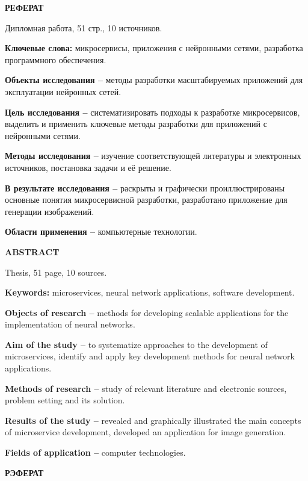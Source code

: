 \begin{center}
  \large\bfseries{РЕФЕРАТ}
\end{center}

Дипломная работа, 51 стр., 10 источников.

\textbf{Ключевые слова:} микросервисы, приложения с нейронными сетями, разработка программного обеспечения.

\textbf{Объекты исследования --} методы разработки масштабируемых приложений для эксплуатации нейронных сетей.

\textbf{Цель исследования --} систематизировать подходы к разработке микросервисов, выделить и применить ключевые методы разработки для приложений с нейронными сетями.

\textbf{Методы исследования --} изучение соответствующей литературы и электронных источников, постановка задачи и её решение.

\textbf{В результате исследования --} раскрыты и графически проиллюстрированы основные понятия микросервисной разработки, разработано приложение для генерации изображений.

\textbf{Области применения --} компьютерные технологии.

\newpage

\begin{center}
  \large\bfseries{ABSTRACT}
\end{center}

Thesis, 51 page, 10 sources.

\textbf{Keywords:} microservices, neural network applications, software development.

\textbf{Objects of research --} methods for developing scalable applications for the implementation of neural networks.

\textbf{Aim of the study --} to systematize approaches to the development of microservices, identify and apply key development methods for neural network applications.

\textbf{Methods of research --} study of relevant literature and electronic sources, problem setting and its solution.

\textbf{Results of the study --} revealed and graphically illustrated the main concepts of microservice development, developed an application for image generation.

\textbf{Fields of application --} computer technologies.

\newpage

\begin{center}
  \large\bfseries{РЭФЕРАТ}
\end{center}

